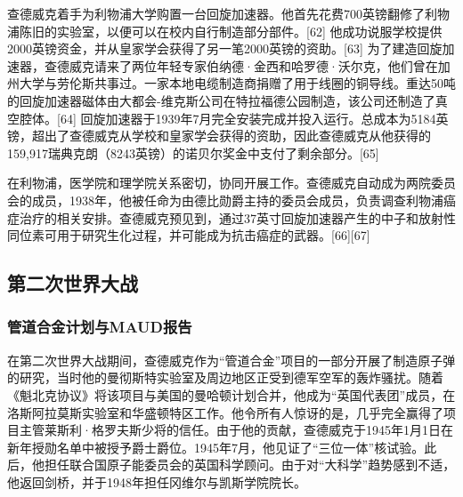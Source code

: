 查德威克着手为利物浦大学购置一台回旋加速器。他首先花费700英镑翻修了利物浦陈旧的实验室，以便可以在校内自行制造部分部件。[62] 他成功说服学校提供2000英镑资金，并从皇家学会获得了另一笔2000英镑的资助。[63] 为了建造回旋加速器，查德威克请来了两位年轻专家伯纳德·金西和哈罗德·沃尔克，他们曾在加州大学与劳伦斯共事过。一家本地电缆制造商捐赠了用于线圈的铜导线。重达50吨的回旋加速器磁体由大都会-维克斯公司在特拉福德公园制造，该公司还制造了真空腔体。[64] 回旋加速器于1939年7月完全安装完成并投入运行。总成本为5184英镑，超出了查德威克从学校和皇家学会获得的资助，因此查德威克从他获得的159,917瑞典克朗（8243英镑）的诺贝尔奖金中支付了剩余部分。[65]

在利物浦，医学院和理学院关系密切，协同开展工作。查德威克自动成为两院委员会的成员，1938年，他被任命为由德比勋爵主持的委员会成员，负责调查利物浦癌症治疗的相关安排。查德威克预见到，通过37英寸回旋加速器产生的中子和放射性同位素可用于研究生化过程，并可能成为抗击癌症的武器。[66][67]
\subsection{第二次世界大战}
\subsubsection{管道合金计划与MAUD报告}
在第二次世界大战期间，查德威克作为“管道合金”项目的一部分开展了制造原子弹的研究，当时他的曼彻斯特实验室及周边地区正受到德军空军的轰炸骚扰。随着《魁北克协议》将该项目与美国的曼哈顿计划合并，他成为“英国代表团”成员，在洛斯阿拉莫斯实验室和华盛顿特区工作。他令所有人惊讶的是，几乎完全赢得了项目主管莱斯利·格罗夫斯少将的信任。由于他的贡献，查德威克于1945年1月1日在新年授勋名单中被授予爵士爵位。1945年7月，他见证了“三位一体”核试验。此后，他担任联合国原子能委员会的英国科学顾问。由于对“大科学”趋势感到不适，他返回剑桥，并于1948年担任冈维尔与凯斯学院院长。

